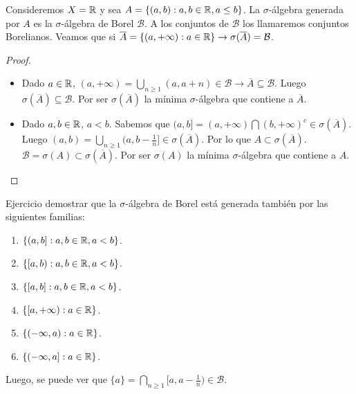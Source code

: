 \begin{eg}
    Consideremos $X = \mathbb{R}$ y sea $A = \{ (a, b) : a, b \in \mathbb{R}, a \leq b \}$. La $\sigma$-álgebra generada por $A$ es la $\sigma$-álgebra de Borel $\mathcal{B}$.
    A los conjuntos de $\mathcal{B}$ los llamaremos conjuntos Borelianos. Veamos que si $\overline{A} = \{ (a, +\infty) : a \in \mathbb{R} \} \to \sigma(\overline{A}) = \mathcal{B}$.
    \begin{proof}
        \begin{itemize}
            \item Dado $a \in \mathbb{R}$, $(a, +\infty) = \bigcup_{n \geq 1} (a, a+n) \in \mathcal{B} \to \overline{A} \subseteq \mathcal{B}$.
                  Luego $\sigma(\overline{A}) \subseteq \mathcal{B}$. Por ser $\sigma(\overline{A})$ la mínima $\sigma$-álgebra que contiene a $\overline{A}$.
            \item Dado $a, b \in \mathbb{R}$, $a < b$. Sabemos que $(a, b] = (a, +\infty) \bigcap (b, +\infty)^c \in \sigma(\overline{A})$.
                  Luego $(a, b) = \bigcup_{n \geq 1} (a, b - \frac{1}{n}] \in \sigma(\overline{A})$. Por lo que $A \subset \sigma(\overline{A})$.
                  $\mathcal{B} = \sigma(A) \subset \sigma(\overline{A})$. Por ser $\sigma(A)$ la mínima $\sigma$-álgebra que contiene a $A$.
        \end{itemize}
    \end{proof}
\end{eg}

Ejercicio demostrar que la $\sigma$-álgebra de Borel está generada también por las siguientes familias:
\begin{enumerate}
    \item $\{ (a, b] : a, b \in \mathbb{R}, a < b \}$.
    \item $\{ [a, b) : a, b \in \mathbb{R}, a < b \}$.
    \item $\{ [a, b] : a, b \in \mathbb{R}, a < b \}$.
    \item $\{ [a, +\infty) : a \in \mathbb{R} \}$.
    \item $\{ (-\infty, a) : a \in \mathbb{R} \}$.
    \item $\{ (-\infty, a] : a \in \mathbb{R} \}$.
\end{enumerate}

Luego, se puede ver que $\{ a \} = \bigcap_{n \geq 1} [a, a - \frac{1}{n}) \in \mathcal{B}$.